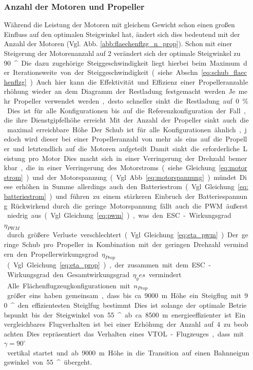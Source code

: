 \subsubsection{Anzahl der Motoren und Propeller}
\label{subsubsec:anz_mot_flaechenflzg}
Während die Leistung der Motoren mit gleichem Gewicht schon einen großen Einfluss auf den optimalen Steigwinkel hat, ändert sich dies bedeutend mit der Anzahl der Motoren (Vgl. Abb. \ref{abb:flaechenflzg_n_prop}). Schon mit einer Steigerung der Motorenanzahl auf 2 verändert sich der optimale Steigwinkel zu \SI{90}{^\circ}. Die dazu zugehörige Steiggeschwindigkeit liegt hierbei beim Maximum der Iterationsweite von der Steiggeschwindigkeit(siehe Abschn. \ref{eq:schub_flaechenflzg}).
Auch hier kann die Effektivität und Effizienz einer Propelleranzahlerhöhung wieder an dem Diagramm der Restladung festgemacht werden. Je mehr Propeller verwendet werden, desto schneller sinkt die Restladung auf \SI{0}{\%}. Dies ist für alle Konfigurationen bis auf die Referenzkonfiguration der Fall, die ihre Dienstgipfelhöhe erreicht. Mit der Anzahl der Propeller sinkt auch die maximal erreichbare Höhe. Der Schub ist für alle Konfigurationen ähnlich, jedoch wird dieser bei einer Propelleranzahl von mehr als eins auf die Propeller und letztendlich auf die Motoren aufgeteilt. Damit sinkt die erforderliche Leistung pro Motor. Dies macht sich in einer Verringerung der Drehzahl bemerkbar, die in einer Verringerung des Motorstroms (siehe Gleichung \ref{eq:motorstrom}) und der Motorspannung (Vgl. Abb. \ref{eq:motorspannung}) mündet. Diese erhöhen in Summe allerdings auch den Batteriestrom (Vgl. Gleichung \ref{eq:batteriestrom}) und führen zu einem stärkeren Einbruch der Batteriespannung. Rückwirkend durch die geringe Motorspannung fällt auch die PWM äußerst niedrig aus (Vgl. Gleichung \ref{eq:pwm}), was den ESC-Wirkungsgrad \ensuremath{\eta_{PWM}} durch größere Verluste verschlechtert (Vgl. Gleichung \ref{eq:eta_pwm}). Der geringe Schub pro Propeller in Kombination mit der geringen Drehzahl vermindern den Propellerwirkungsgrad \ensuremath{\eta_{Prop}} (Vgl. Gleichung \ref{eq:eta_prop}), der zusammen mit dem ESC-Wirkungsgrad den Gesamtwirkungsgrad \ensuremath{\eta_ges} vermindert.\\
Alle Flächenflugzeugkonfigurationen mit \ensuremath{n_{Prop}} größer eins haben gemeinsam, dass bis ca. \SI{9000}{m} Höhe ein Steigflug mit \SI{90}{^\circ} den effizientesten Steiglfug bestimmt. 
Dies ist solange der optimale Betriebspunkt bis der Steigwinkel von \SI{55}{^\circ} ab ca. \SI{8500}{m} energieeffizienter ist. Ein vergleichbares Flugverhalten ist bei einer Erhöhung der Anzahl auf 4 zu beobachten. Dies repräsentiert das Verhalten eines VTOL-Flugzeuges, dass mit \ensuremath{\gamma = 90^\circ} vertikal startet und ab \SI{9000}{m} Höhe in die Transition auf einen Bahnneigungswinkel von \SI{55}{^\circ} übergeht. 
